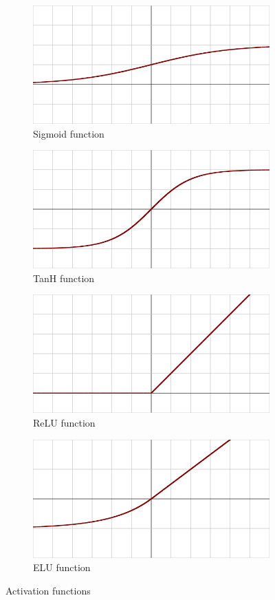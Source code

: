 \documentclass{kththesis}
\begin{document}
\begin{figure}
\centering
\begin{subfigure}{.5\textwidth}
\centering
\includegraphics[width=0.7\linewidth]{images/Activation_logistic.png}
\caption{Sigmoid function}
\label{fig:sigmoid}
\end{subfigure}%
\begin{subfigure}{.5\textwidth}
\centering
\includegraphics[width=0.7\linewidth]{images/Activation_tanh.png}
\caption{TanH function}
\label{fig:tanh}
\end{subfigure}
\begin{subfigure}{.5\textwidth}
\centering
\includegraphics[width=0.7\linewidth]{images/Activation_rectified_linear.png}
\caption{ReLU function}
\label{fig:relu}
\end{subfigure}%
\begin{subfigure}{.5\textwidth}
\centering
\includegraphics[width=0.7\linewidth]{images/Activation_elu.png}
\caption{ELU function}
\label{fig:elu}
\end{subfigure}%

\caption{Activation functions}
\end{figure}
\end{document}
